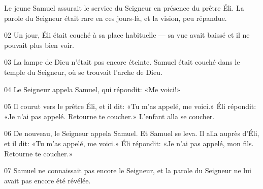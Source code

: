 Le jeune Samuel assurait le service du Seigneur en présence du prêtre Éli. La parole du Seigneur était rare en ces jours-là, et la vision, peu répandue.

02 Un jour, Éli était couché à sa place habituelle --- sa vue avait baissé et il ne pouvait plus bien voir.

03 La lampe de Dieu n’était pas encore éteinte. Samuel était couché dans le temple du Seigneur, où se trouvait l’arche de Dieu.

04 Le Seigneur appela Samuel, qui répondit: «Me voici!»

05 Il courut vers le prêtre Éli, et il dit: «Tu m’as appelé, me voici.» Éli répondit: «Je n’ai pas appelé. Retourne te coucher.» L’enfant alla se coucher.

06 De nouveau, le Seigneur appela Samuel. Et Samuel se leva. Il alla auprès d’Éli, et il dit: «Tu m’as appelé, me voici.» Éli répondit: «Je n’ai pas appelé, mon fils. Retourne te coucher.»

07 Samuel ne connaissait pas encore le Seigneur, et la parole du Seigneur ne lui avait pas encore été révélée.
